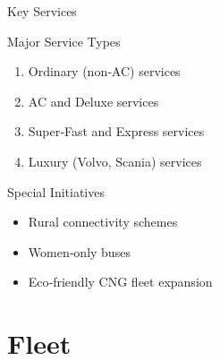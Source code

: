 \documentclass[aspectratio=169,11pt]{beamer}
\begin{document}
\begin{frame}{Key Services}

  \begin{alertblock}{Major Service Types}

    \begin{enumerate}

      \item Ordinary (non‑AC) services

      \item AC and Deluxe services

      \item Super‑Fast and Express services

      \item Luxury (Volvo, Scania) services

    \end{enumerate}

  \end{alertblock}

  \begin{exampleblock}{Special Initiatives}

    \begin{itemize}

      \item Rural connectivity schemes

      \item Women‑only buses

      \item Eco‑friendly CNG fleet expansion

    \end{itemize}

  \end{exampleblock}

\end{frame}




\section{Fleet}
\end{document}
